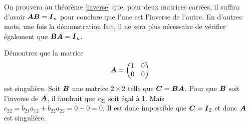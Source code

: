 On prouvera au théorème \ref{inverse} que, pour deux matrices carrées, il suffira d'avoir  $\boldsymbol{A}\boldsymbol{B}=\boldsymbol{I}_n$ 
pour conclure que l'une est l'inverse de l'autre.  En d'autres mots, une fois la démonstration fait, il ne sera
plus nécessaire de vérifier également que $\boldsymbol{B}\boldsymbol{A}=\boldsymbol{I}_n$. 
 
 \begin{exemple}
 Démontrez que la matrice
 \[
     \boldsymbol{A} = \begin{pmatrix}
     1 & 0 \\
     0 & 0
     \end{pmatrix}
 \]
 est singulière.
 \solution
 Soit $\boldsymbol{B}$ une matrice $2\times2$ telle que $\boldsymbol{C}=\boldsymbol{B}\boldsymbol{A}$.  
 Pour que $\boldsymbol{B}$ soit l'inverse de $\boldsymbol{A}$, il faudrait que $c_{22}$ soit égal à 1.  Mais $c_{22} = b_{21}a_{12} + b_{22}a_{22} = 0+0 = 0$.  Il est donc impossible que $\boldsymbol{C}=\boldsymbol{I}_2$ et donc $\boldsymbol{A}$ est singulière. 
 \end{exemple}
 
